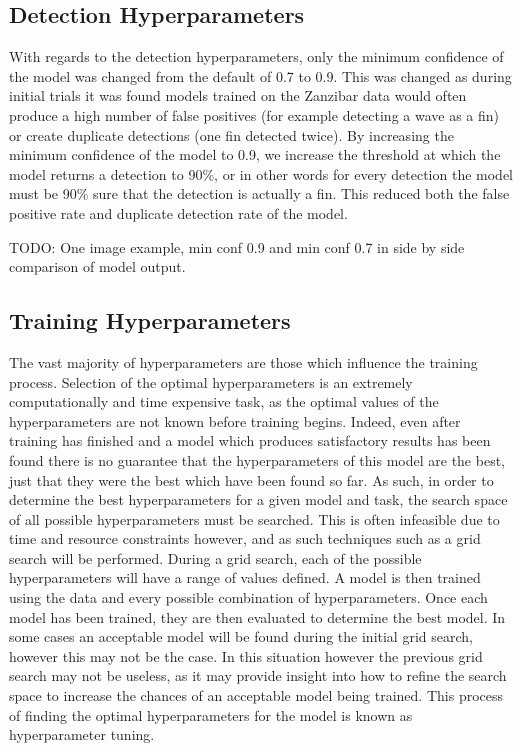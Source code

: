 \subsection{Detection Hyperparameters}\label{ch:cetDet,sec:ModelSelection,sub:DetectionHyperparameters}
 
 With regards to the detection hyperparameters, only the minimum confidence of the model was changed from the default of 0.7 to 0.9. This was changed as during initial trials it was found models trained on the Zanzibar data would often produce a high number of false positives (for example detecting a wave as a fin) or create duplicate detections (one fin detected twice). By increasing the minimum confidence of the model to 0.9, we increase the threshold at which the model returns a detection to 90\%, or in other words for every detection the model must be 90\% sure that the detection is actually a fin. This reduced both the false positive rate and duplicate detection rate of the model.
 
 TODO: One image example, min conf 0.9 and min conf 0.7 in side by side comparison of model output.
 
 
\subsection{Training Hyperparameters}\label{ch:cetDet,sec:ModelSelection,sub:TrainingHyperparameters}

The vast majority of hyperparameters are those which influence the training process. Selection of the optimal hyperparameters is an extremely computationally and time expensive task, as the optimal values of the hyperparameters are not known before training begins. Indeed, even after training has finished and a model which produces satisfactory results has been found there is no guarantee that the hyperparameters of this model are the best, just that they were the best which have been found so far. As such, in order to determine the best hyperparameters for a given model and task, the search space of all possible hyperparameters must be searched. This is often infeasible due to time and resource constraints however, and as such techniques such as a grid search will be performed. During a grid search, each of the possible hyperparameters will have a range of values defined. A model is then trained using the data and every possible combination of hyperparameters. Once each model has been trained, they are then evaluated to determine the best model. In some cases an acceptable model will be found during the initial grid search, however this may not be the case. In this situation however the previous grid search may not be useless, as it may provide insight into how to refine the search space to increase the chances of an acceptable model being trained. This process of finding the optimal hyperparameters for the model is known as hyperparameter tuning. 

